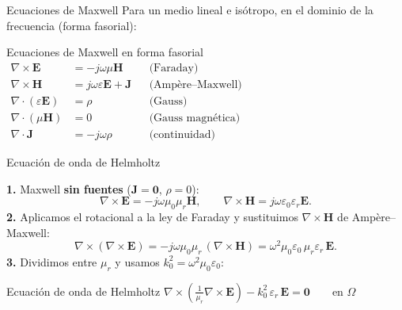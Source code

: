 \documentclass{beamer}
\begin{document}
\begin{frame}{Ecuaciones de Maxwell}
  Para un medio lineal e isótropo, en el dominio de la frecuencia (forma fasorial):
  \begin{center}
  \begin{minipage}{0.86\textwidth}
    \begin{block}{Ecuaciones de Maxwell en forma fasorial}
      \centering
      $\displaystyle
      \begin{aligned}
        \nabla \times \mathbf{E} &= -j\omega\mu\mathbf{H}
          && \text{(Faraday)} \\
        \nabla \times \mathbf{H} &= j\omega\varepsilon\mathbf{E} + \mathbf{J}
          && \text{(Ampère--Maxwell)} \\
        \nabla \cdot (\varepsilon\mathbf{E}) &= \rho
          && \text{(Gauss)} \\
        \nabla \cdot (\mu\mathbf{H}) &= 0
          && \text{(Gauss magnética)} \\
        \nabla \cdot \mathbf{J} &= -j\omega\rho
          && \text{(continuidad)}
      \end{aligned}$
    \end{block}
  \end{minipage}
  \end{center}
\end{frame}

\begin{frame}{Ecuación de onda de Helmholtz}
  \vspace{-0.25cm}
  \setlength{\abovedisplayskip}{2pt}
  \setlength{\belowdisplayskip}{2pt}
  \begin{center}
  \begin{minipage}{0.94\textwidth}
    \small
    \textbf{1.} Maxwell \textbf{sin fuentes} ($\mathbf{J}=\mathbf{0}$, $\rho=0$):
    \[
      \nabla\times\mathbf{E} = -j\omega\mu_0\mu_r\mathbf{H},
      \qquad
      \nabla\times\mathbf{H} = j\omega\varepsilon_0\varepsilon_r\mathbf{E}.
    \]
    \textbf{2.} Aplicamos el rotacional a la ley de Faraday y sustituimos
    $\nabla\times\mathbf{H}$ de Ampère--Maxwell:
    \[
      \nabla\times(\nabla\times\mathbf{E})
      = -j\omega\mu_0\mu_r\,(\nabla\times\mathbf{H})
      = \omega^2\mu_0\varepsilon_0\,\mu_r\varepsilon_r\,\mathbf{E}.
    \]
    \textbf{3.} Dividimos entre $\mu_r$ y usamos $k_0^2=\omega^2\mu_0\varepsilon_0$:
    \begin{block}{Ecuación de onda de Helmholtz}
      \centering
      $\displaystyle
        \nabla \times \left( \frac{1}{\mu_r} \nabla \times \mathbf{E} \right)
        - k_0^2\, \varepsilon_r\, \mathbf{E} = \mathbf{0}
        \qquad \text{en } \Omega$
    \end{block}
  \end{minipage}
  \end{center}
\end{frame}
\end{document}
